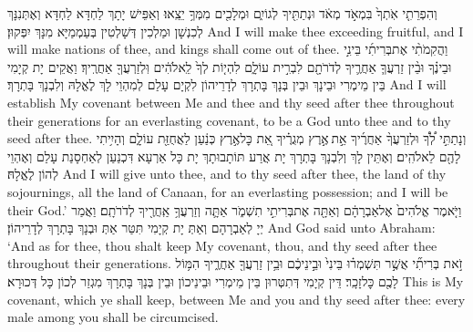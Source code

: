 {וְהִפְרֵתִ֤י אֹֽתְךָ֙ בִּמְאֹ֣ד מְאֹ֔ד וּנְתַתִּ֖יךָ לְגוֹיִ֑ם וּמְלָכִ֖ים מִמְּךָ֥ יֵצֵֽאוּ׃}
{וְאַפֵּישׁ יָתָךְ לַחְדָּא לַחְדָּא וְאֶתְּנִנָּךְ לְכִנְשָׁן וּמַלְכִין דְּשָׁלְטִין בְּעַמְמַיָּא מִנָּךְ יִפְּקוּן׃}
{And I will make thee exceeding fruitful, and I will make nations of thee, and kings shall come out of thee.}{}
{וַהֲקִמֹתִ֨י אֶת\maqqaf בְּרִיתִ֜י בֵּינִ֣י וּבֵינֶ֗ךָ וּבֵ֨ין זַרְעֲךָ֧ אַחֲרֶ֛יךָ לְדֹרֹתָ֖ם לִבְרִ֣ית עוֹלָ֑ם לִהְי֤וֹת לְךָ֙ לֵֽאלֹהִ֔ים וּֽלְזַרְעֲךָ֖ אַחֲרֶֽיךָ׃}
{וַאֲקֵים יָת קְיָמִי בֵּין מֵימְרִי וּבֵינָךְ וּבֵין בְּנָךְ בָּתְרָךְ לְדָרֵיהוֹן לִקְיָם עָלַם לְמִהְוֵי לָךְ לֶאֱלָהּ וְלִבְנָךְ בָּתְרָךְ׃}
{And I will establish My covenant between Me and thee and thy seed after thee throughout their generations for an everlasting covenant, to be a God unto thee and to thy seed after thee.}{}
{וְנָתַתִּ֣י לְ֠ךָ֠ וּלְזַרְעֲךָ֨ אַחֲרֶ֜יךָ אֵ֣ת \legarmeh  אֶ֣רֶץ מְגֻרֶ֗יךָ אֵ֚ת כׇּל\maqqaf אֶ֣רֶץ כְּנַ֔עַן לַאֲחֻזַּ֖ת עוֹלָ֑ם וְהָיִ֥יתִי לָהֶ֖ם לֵאלֹהִֽים׃}
{וְאֶתֵּין לָךְ וְלִבְנָךְ בָּתְרָךְ יָת אֲרַע תּוֹתָבוּתָךְ יָת כָּל אַרְעָא דִּכְנַעַן לְאַחְסָנַת עָלַם וְאֶהְוֵי לְהוֹן לֶאֱלָהּ׃}
{And I will give unto thee, and to thy seed after thee, the land of thy sojournings, all the land of Canaan, for an everlasting possession; and I will be their God.’}{}
{וַיֹּ֤אמֶר אֱלֹהִים֙ אֶל\maqqaf אַבְרָהָ֔ם וְאַתָּ֖ה אֶת\maqqaf בְּרִיתִ֣י תִשְׁמֹ֑ר אַתָּ֛ה וְזַרְעֲךָ֥ אַֽחֲרֶ֖יךָ לְדֹרֹתָֽם׃}
{וַאֲמַר יְיָ לְאַבְרָהָם וְאַתְּ יָת קְיָמִי תִּטַּר אַתְּ וּבְנָךְ בָּתְרָךְ לְדָרֵיהוֹן׃}
{And God said unto Abraham: ‘And as for thee, thou shalt keep My covenant, thou, and thy seed after thee throughout their generations.}{}
{זֹ֣את בְּרִיתִ֞י אֲשֶׁ֣ר תִּשְׁמְר֗וּ בֵּינִי֙ וּבֵ֣ינֵיכֶ֔ם וּבֵ֥ין זַרְעֲךָ֖ אַחֲרֶ֑יךָ הִמּ֥וֹל לָכֶ֖ם כׇּל\maqqaf זָכָֽר׃}
{דֵּין קְיָמִי דְּתִטְּרוּן בֵּין מֵימְרִי וּבֵינֵיכוֹן וּבֵין בְּנָךְ בָּתְרָךְ מִגְזַר לְכוֹן כָּל דְּכוּרָא׃}
{This is My covenant, which ye shall keep, between Me and you and thy seed after thee: every male among you shall be circumcised.}{}
